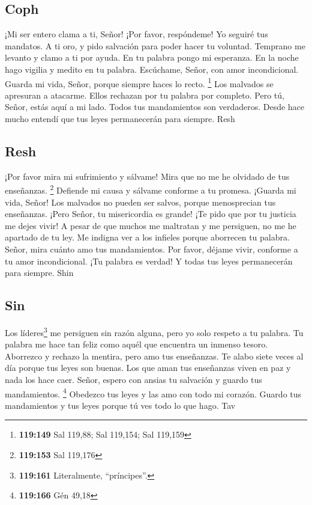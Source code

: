 \hypertarget{coph}{%
\subsection{Coph}\label{coph}}

 ¡Mi ser entero clama a ti, Señor! ¡Por favor,
respóndeme! Yo seguiré tus mandatos.  A ti oro, y pido
salvación para poder hacer tu voluntad.  Temprano me
levanto y clamo a ti por ayuda. En tu palabra pongo mi esperanza.
 En la noche hago vigilia y medito en tu palabra.
 Escúchame, Señor, con amor incondicional. Guarda mi
vida, Señor, porque siempre haces lo recto. \footnote{\textbf{119:149}
  Sal 119,88; Sal 119,154; Sal 119,159}  Los malvados se
apresuran a atacarme. Ellos rechazan por tu palabra por completo.
 Pero tú, Señor, estás aquí a mi lado. Todos tus
mandamientos son verdaderos.  Desde hace mucho entendí
que tus leyes permanecerán para siempre. Resh

\hypertarget{resh}{%
\subsection{Resh}\label{resh}}

 ¡Por favor mira mi sufrimiento y sálvame! Mira que no
me he olvidado de tus enseñanzas. \footnote{\textbf{119:153} Sal 119,176}
 Defiende mi causa y sálvame conforme a tu promesa.
¡Guarda mi vida, Señor!  Los malvados no pueden ser
salvos, porque menosprecian tus enseñanzas.  ¡Pero
Señor, tu misericordia es grande! ¡Te pido que por tu justicia me dejes
vivir!  A pesar de que muchos me maltratan y me
persiguen, no me he apartado de tu ley.  Me indigna ver
a los infieles porque aborrecen tu palabra.  Señor, mira
cuánto amo tus mandamientos. Por favor, déjame vivir, conforme a tu amor
incondicional.  ¡Tu palabra es verdad! Y todas tus leyes
permanecerán para siempre. Shin

\hypertarget{sin}{%
\subsection{Sin}\label{sin}}

 Los líderes\footnote{\textbf{119:161} Literalmente,
  ``príncipes''.} me persiguen sin razón alguna, pero yo solo respeto a
tu palabra.  Tu palabra me hace tan feliz como aquél que
encuentra un inmenso tesoro.  Aborrezco y rechazo la
mentira, pero amo tus enseñanzas.  Te alabo siete veces
al día porque tus leyes son buenas.  Los que aman tus
enseñanzas viven en paz y nada los hace caer.  Señor,
espero con ansias tu salvación y guardo tus mandamientos. \footnote{\textbf{119:166}
  Gén 49,18}  Obedezco tus leyes y las amo con todo mi
corazón.  Guardo tus mandamientos y tus leyes porque tú
ves todo lo que hago. Tav

